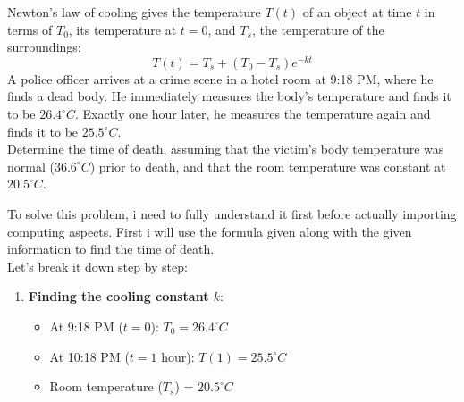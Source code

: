 \documentclass[a4paper, 12pt]{report}
\begin{document}
    
    \newpage
    \def\ni{blue!20!white}
    \begin{tcolorbox}[title={\color{black}{\section{Q3}}}, colback=white, colframe=\ni, boxrule=1mm, width=1\textwidth]
        \centering
        Newton's law of cooling gives the temperature \( T(t) \) of an object at time \( t \) in terms of \( T_0 \), its temperature at \( t = 0 \), and \( T_s \), the temperature of the surroundings:
        \[
        T(t) = T_s + (T_0 - T_s)e^{-kt}
        \]
        A police officer arrives at a crime scene in a hotel room at 9:18 PM, where he finds a dead body. He immediately measures the body's temperature and finds it to be \( 26.4^\circ C \). Exactly one hour later, he measures the temperature again and finds it to be \( 25.5^\circ C \).\\[6pt]
        Determine the time of death, assuming that the victim's body temperature was normal (\( 36.6^\circ C \)) prior to death, and that the room temperature was constant at \( 20.5^\circ C \).
    \end{tcolorbox}
    
    To solve this problem, i need to fully understand it first before actually importing computing aspects. First i will use the formula given along with the given information to find the time of death.\\[6pt] Let's break it down step by step:\\[1em]
    
    \raggedright
    \begin{enumerate}[itemsep=-0.1cm]
        \item \textbf{Finding the cooling constant \( k \)}:\\
        \begin{itemize} 
            \item At 9:18 PM (\( t = 0 \)): \( T_0 = 26.4^\circ C \)
            \item At 10:18 PM (\( t = 1 \) hour): \( T(1) = 25.5^\circ C \)
            \item Room temperature (\( T_s \)) = \( 20.5^\circ C \)    
        \end{itemize}
    \end{enumerate}    
    
\end{document}
